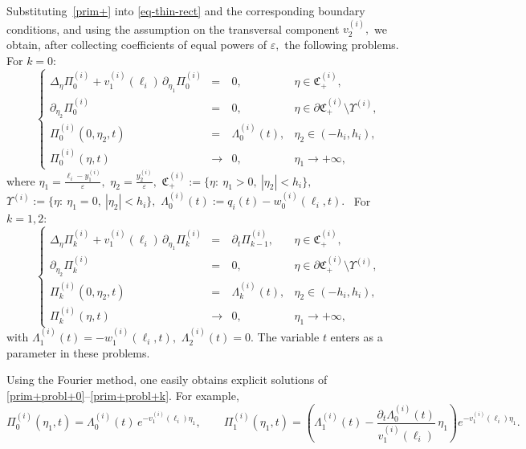 \documentclass[reqno]{amsart}            %
\numberwithin{equation}{section}
\begin{document}
	Substituting~\eqref{prim+} into \eqref{eq-thin-rect} and the corresponding boundary conditions, and using the assumption on the transversal component $v_2^{(i)},$ we obtain, after collecting coefficients of equal powers of 
	$\varepsilon,$ the following problems.
	For $k=0$:
	\begin{equation}\label{prim+probl+0}
		\left\{
		\begin{array}{rcll}
			\Delta_\eta \Pi_0^{(i)} + v_1^{(i)}(\ell_i)\,\partial_{\eta_1}\Pi_0^{(i)}
			&=& 0,
			& \eta\in\mathfrak{C}_+^{(i)},
			\\[2mm]
			\partial_{\eta_2}\Pi_0^{(i)} &=& 0,
			& \eta\in\partial\mathfrak{C}_+^{(i)}\setminus\Upsilon^{(i)},
			\\[2mm]
			\Pi_0^{(i)}(0,\eta_2,t) &=& \Lambda^{(i)}_0(t),
			& \eta_2\in(-h_i,h_i),
			\\[2mm]
			\Pi_0^{(i)}(\eta,t) &\to& 0,
			& \eta_1\to+\infty,
		\end{array}
		\right.
	\end{equation}
	where $\eta_1 = \frac{\ell_i - y_1^{(i)}}{\varepsilon},$ $\eta_2 = \frac{y_2^{(i)}}{\varepsilon},$
	$\mathfrak{C}_+^{(i)} := \{\eta:\ \eta_1>0,\ |\eta_2|<h_i\},$ $\Upsilon^{(i)} := \{\eta:\ \eta_1=0,\ |\eta_2|<h_i\},$
	$\Lambda^{(i)}_0(t) := q_i(t) - w_0^{(i)}(\ell_i,t). $
	\
	For $k=1,2$:
	\begin{equation}\label{prim+probl+k}
		\left\{
		\begin{array}{rcll}
			\Delta_\eta \Pi_k^{(i)} + v_1^{(i)}(\ell_i)\,\partial_{\eta_1}\Pi_k^{(i)}
			&=& \partial_t \Pi_{k-1}^{(i)},
			& \eta\in\mathfrak{C}_+^{(i)},
			\\[2mm]
			\partial_{\eta_2}\Pi_k^{(i)} &=& 0,
			& \eta\in\partial\mathfrak{C}_+^{(i)}\setminus\Upsilon^{(i)},
			\\[2mm]
			\Pi_k^{(i)}(0,\eta_2,t) &=& \Lambda^{(i)}_k(t),
			& \eta_2\in(-h_i,h_i),
			\\[2mm]
			\Pi_k^{(i)}(\eta,t) &\to& 0,
			& \eta_1\to+\infty,
		\end{array}
		\right.
	\end{equation}
	with $\Lambda^{(i)}_1(t) = -w_1^{(i)}(\ell_i,t),$ $\Lambda^{(i)}_2(t) = 0.$ The variable $t$ enters as a parameter in these problems.
	
	Using the Fourier method, one easily obtains explicit solutions of
	\eqref{prim+probl+0}–\eqref{prim+probl+k}. For example,
	\[
	\Pi_0^{(i)}(\eta_1,t)
	= \Lambda_0^{(i)}(t)\,e^{-v_1^{(i)}(\ell_i)\eta_1},
	\qquad
	\Pi_1^{(i)}(\eta_1,t)
	= \left(\Lambda_1^{(i)}(t)
	- \frac{\partial_t\Lambda_0^{(i)}(t)}{v_1^{(i)}(\ell_i)}\,\eta_1\right)
	e^{-v_1^{(i)}(\ell_i)\eta_1}.
	\]
	
\end{document}
